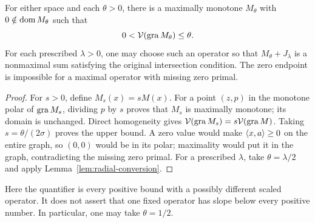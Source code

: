 \begin{corollary}\label{cor:flat}
For either space and each $\theta>0$, there is a maximally monotone
$M_\theta$ with $0\notin\operatorname{dom} M_\theta$ such that
\[
0<\mathcal V(\operatorname{gra} M_\theta)\le\theta.
\]
For each prescribed $\lambda>0$, one may choose such an operator so
that $M_\theta+J_\lambda$ is a nonmaximal sum satisfying the original
intersection condition. The zero endpoint is impossible for a maximal
operator with missing zero primal.
\end{corollary}
\begin{proof}
For $s>0$, define $M_s(x)=sM(x)$. For a point $(z,p)$ in the monotone polar of $\operatorname{gra} M_s$, dividing $p$ by $s$ proves that $M_s$ is maximally monotone; its domain
is unchanged. Direct homogeneity gives
$\mathcal V(\operatorname{gra} M_s)=s\mathcal V(\operatorname{gra} M)$.
Taking $s=\theta/(2\sigma)$ proves the upper bound. A zero value would
make $\langle x,a\rangle\ge0$ on the entire graph, so $(0,0)$ would be in
its polar; maximality would put it in the graph, contradicting the
missing zero primal. For a prescribed $\lambda$, take
$\theta=\lambda/2$ and apply Lemma~\ref{lem:radial-conversion}.
\end{proof}
Here the quantifier is every positive bound with a possibly different
scaled operator. It does not assert that one fixed operator has slope
below every positive number. In particular, one may take $\theta=1/2$.

